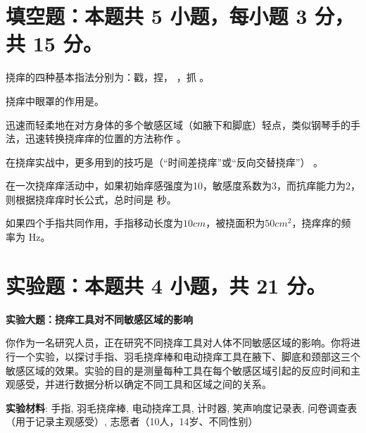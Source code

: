 \documentclass{exam-zh}
\begin{document}
\section{填空题：本题共 5 小题，每小题 3 分，共 15 分。}


\begin{question}
  挠痒的四种基本指法分别为：戳，捏， \fillin[$1$]，抓 。
\end{question}

\begin{question}
  挠痒中眼罩的作用是\fillin[$2$] 。
\end{question}

\begin{question}
  迅速而轻柔地在对方身体的多个敏感区域（如腋下和脚底）轻点，类似钢琴手的手法，迅速转换挠痒痒的位置的方法称作 \fillin[$1$]。
\end{question}

\begin{question}
  在挠痒实战中，更多用到的技巧是\fillin[$1$]（“时间差挠痒”或“反向交替挠痒”） 。
\end{question}

\begin{question}
  在一次挠痒痒活动中，如果初始痒感强度为10，敏感度系数为3，而抗痒能力为2，则根据挠痒痒时长公式，总时间是 \fillin[$1$] 秒。
\end{question}


\begin{question}
  如果四个手指共同作用，手指移动长度为$10 {cm}$，被挠面积为$50 {cm}^2$，挠痒痒的频率为  \fillin[$1$] Hz。
\end{question}


\section{实验题：本题共 4 小题，共 21 分。}


\textbf{实验大题：挠痒工具对不同敏感区域的影响}

你作为一名研究人员，正在研究不同挠痒工具对人体不同敏感区域的影响。你将进行一个实验，以探讨手指、羽毛挠痒棒和电动挠痒工具在腋下、脚底和颈部这三个敏感区域的效果。实验的目的是测量每种工具在每个敏感区域引起的反应时间和主观感受，并进行数据分析以确定不同工具和区域之间的关系。

\textbf{实验材料}: 手指, 羽毛挠痒棒, 电动挠痒工具, 计时器, 笑声响度记录表, 问卷调查表（用于记录主观感受）, 志愿者（10人，14岁、不同性别）
\end{document}
